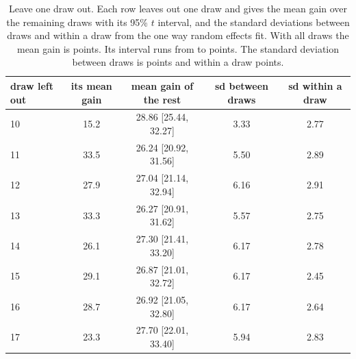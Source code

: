 \begin{table}[H]
\centering
\small
\caption{Leave one draw out. Each row leaves out one draw and gives the mean gain over the remaining draws with its 95\% $t$ interval, and the standard deviations between draws and within a draw from the one way random effects fit. With all \nDraws draws the mean gain is \gainMeanExact points. Its interval runs from \gainLoExact to \gainHiExact points. The standard deviation between draws is \sdBetween points and within a draw \sdWithin points.}
\label{tab:loo}
\begin{tabular}{@{}lcccc@{}}
\toprule
draw left out & its mean gain & mean gain of the rest & sd between draws & sd within a draw \\
\midrule
10 & 15.2 & 28.86 [25.44, 32.27] & 3.33 & 2.77 \\
11 & 33.5 & 26.24 [20.92, 31.56] & 5.50 & 2.89 \\
12 & 27.9 & 27.04 [21.14, 32.94] & 6.16 & 2.91 \\
13 & 33.3 & 26.27 [20.91, 31.62] & 5.57 & 2.75 \\
14 & 26.1 & 27.30 [21.41, 33.20] & 6.17 & 2.78 \\
15 & 29.1 & 26.87 [21.01, 32.72] & 6.17 & 2.45 \\
16 & 28.7 & 26.92 [21.05, 32.80] & 6.17 & 2.64 \\
17 & 23.3 & 27.70 [22.01, 33.40] & 5.94 & 2.83 \\
\bottomrule
\end{tabular}
\end{table}
